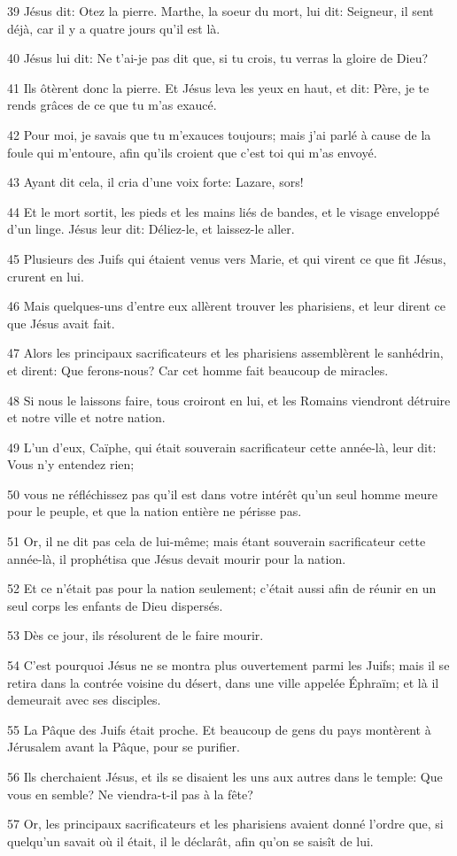 \par 39 Jésus dit: Otez la pierre. Marthe, la soeur du mort, lui dit: Seigneur, il sent déjà, car il y a quatre jours qu'il est là.
\par 40 Jésus lui dit: Ne t'ai-je pas dit que, si tu crois, tu verras la gloire de Dieu?
\par 41 Ils ôtèrent donc la pierre. Et Jésus leva les yeux en haut, et dit: Père, je te rends grâces de ce que tu m'as exaucé.
\par 42 Pour moi, je savais que tu m'exauces toujours; mais j'ai parlé à cause de la foule qui m'entoure, afin qu'ils croient que c'est toi qui m'as envoyé.
\par 43 Ayant dit cela, il cria d'une voix forte: Lazare, sors!
\par 44 Et le mort sortit, les pieds et les mains liés de bandes, et le visage enveloppé d'un linge. Jésus leur dit: Déliez-le, et laissez-le aller.
\par 45 Plusieurs des Juifs qui étaient venus vers Marie, et qui virent ce que fit Jésus, crurent en lui.
\par 46 Mais quelques-uns d'entre eux allèrent trouver les pharisiens, et leur dirent ce que Jésus avait fait.
\par 47 Alors les principaux sacrificateurs et les pharisiens assemblèrent le sanhédrin, et dirent: Que ferons-nous? Car cet homme fait beaucoup de miracles.
\par 48 Si nous le laissons faire, tous croiront en lui, et les Romains viendront détruire et notre ville et notre nation.
\par 49 L'un d'eux, Caïphe, qui était souverain sacrificateur cette année-là, leur dit: Vous n'y entendez rien;
\par 50 vous ne réfléchissez pas qu'il est dans votre intérêt qu'un seul homme meure pour le peuple, et que la nation entière ne périsse pas.
\par 51 Or, il ne dit pas cela de lui-même; mais étant souverain sacrificateur cette année-là, il prophétisa que Jésus devait mourir pour la nation.
\par 52 Et ce n'était pas pour la nation seulement; c'était aussi afin de réunir en un seul corps les enfants de Dieu dispersés.
\par 53 Dès ce jour, ils résolurent de le faire mourir.
\par 54 C'est pourquoi Jésus ne se montra plus ouvertement parmi les Juifs; mais il se retira dans la contrée voisine du désert, dans une ville appelée Éphraïm; et là il demeurait avec ses disciples.
\par 55 La Pâque des Juifs était proche. Et beaucoup de gens du pays montèrent à Jérusalem avant la Pâque, pour se purifier.
\par 56 Ils cherchaient Jésus, et ils se disaient les uns aux autres dans le temple: Que vous en semble? Ne viendra-t-il pas à la fête?
\par 57 Or, les principaux sacrificateurs et les pharisiens avaient donné l'ordre que, si quelqu'un savait où il était, il le déclarât, afin qu'on se saisît de lui.

